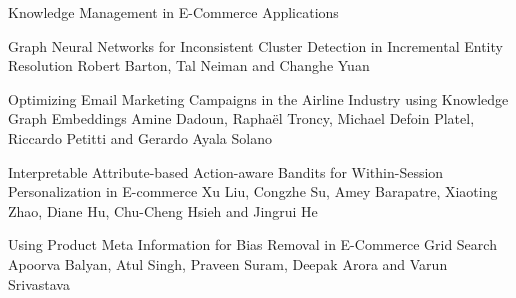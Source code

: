 \documentclass[11pt]{article}
\begin{document}
\begin{bulletin}
\begin{articlesection}{Knowledge Management in E-Commerce Applications}
\begin{article}
{Graph Neural Networks for Inconsistent Cluster Detection in Incremental Entity Resolution}
{Robert Barton, Tal Neiman and Changhe Yuan}

\end{article}


\begin{article}
{Optimizing Email Marketing Campaigns in the Airline Industry using Knowledge Graph Embeddings}
{Amine Dadoun, Raphaël Troncy, Michael Defoin Platel, Riccardo Petitti and Gerardo Ayala Solano}

\end{article}

\begin{article}
{Interpretable Attribute-based Action-aware Bandits for Within-Session Personalization in E-commerce}
{Xu Liu, Congzhe Su, Amey Barapatre, Xiaoting Zhao, Diane Hu, Chu-Cheng Hsieh and Jingrui He}

\end{article}

\begin{article}
{Using Product Meta Information for Bias Removal in E-Commerce Grid Search}
{Apoorva Balyan, Atul Singh, Praveen Suram, Deepak Arora and Varun Srivastava}

\end{article}



\end{articlesection}

\begin{callsection}


\end{callsection}
\end{bulletin}
\end{document}
